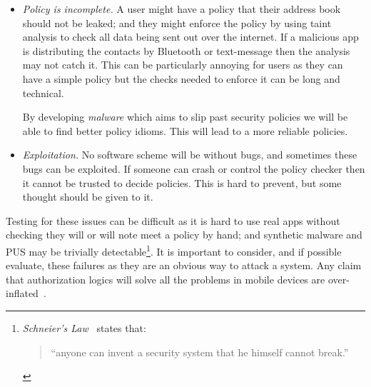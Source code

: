 \documentclass[a4paper]{article}
\begin{document}
\begin{description}
\begin{itemize}
        This kind of failure will lead to decisions being authorized which
        shouldn't have been. How this affects the security of the device and
        knowing what must be done to recover from it is important for policies
        to be resiliant.  A variation of this might be an service which stops
        decisions being authorized.  For example, suppose a video streaming
        service bribed an antivirus service to say all its competitors were
        malicious.  Knowing how to recover from this (especially after a user
        may have installed the video streamer out of frustration) is not
        obvious\footnote{Though perhaps a similar solution to Microsoft's
        Internet Explorer being compelled to advertise alternatives might work
          well.}.

      \item \emph{Policy is incomplete.}  A user might have a policy that their
        address book should not be leaked; and they might enforce the policy by
        using taint analysis to check all data being sent out over the internet.
        If a malicious app is distributing the contacts by Bluetooth or
        text-message then the analysis may not catch it.  This can be
        particularly annoying for users as they can have a simple policy but the
        checks needed to enforce it can be long and technical.

        By developing \emph{malware} which aims to slip past security
        policies we will be able to find better policy idioms.  This will lead
        to a more reliable policies.

      \item \emph{Exploitation.}  No software scheme will be without bugs, and
        sometimes these bugs can be exploited.  If someone can crash or control
        the policy checker then it cannot be trusted to decide policies.
        This is hard to prevent, but some thought should be given to it.
    
    \end{itemize}
  
    Testing for these issues can be difficult as it is hard to use real apps
    without checking they will or will note meet a policy by hand; and synthetic
    malware and \ac{PUS} may be trivially detectable\footnote{\emph{Schneier's
    Law}~\cite{Schneier:ws} states that: \begin{quote}``anyone can invent a security
      system that he himself cannot break.''\end{quote}}.  It is important to
    consider, and if possible evaluate, these failures as they are an obvious
    way to attack a system.  Any claim that authorization logics will solve all
    the problems in mobile devices are over-inflated~\cite{Kruger:1999dd}.

\end{description}
\end{document}
